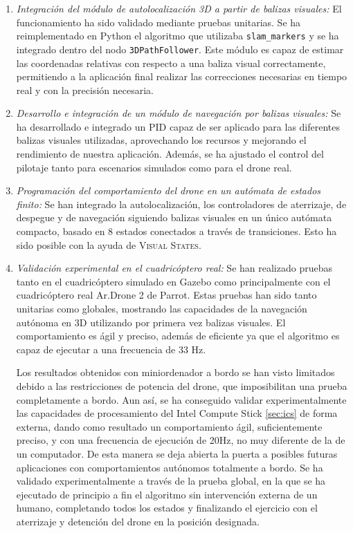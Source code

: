 \begin{enumerate}
	\item \textit{Integración del módulo de autolocalización 3D a partir de balizas visuales:} El funcionamiento ha sido validado mediante pruebas unitarias. Se ha reimplementado en Python el algoritmo que utilizaba \texttt{slam\_markers} y se ha integrado dentro del nodo \texttt{3DPathFollower}. Este módulo es capaz de estimar las coordenadas relativas con respecto a una baliza visual correctamente, permitiendo a la aplicación final realizar las correcciones necesarias en tiempo real y con la precisión necesaria.
	\item \textit{Desarrollo e integración de un módulo de navegación por balizas visuales:} Se ha desarrollado e integrado un PID capaz de ser aplicado para las diferentes balizas visuales utilizadas, aprovechando los recursos y mejorando el rendimiento de nuestra aplicación. Además, se ha ajustado el control del pilotaje tanto para escenarios simulados como para el drone real.
	\item \textit{Programación del comportamiento del drone en un autómata de estados finito:} Se han integrado la autolocalización, los controladores de aterrizaje, de despegue y de navegación siguiendo balizas visuales en un único autómata compacto, basado en 8 estados conectados a través de transiciones. Esto ha sido posible con la ayuda de \textsc{Visual States}.
	\item \textit{Validación experimental en el cuadricóptero  real:} Se han realizado pruebas tanto en el cuadricóptero simulado en Gazebo como principalmente con el cuadricóptero real Ar.Drone 2 de Parrot. Estas pruebas han sido tanto unitarias como globales, mostrando las capacidades de la navegación autónoma en 3D utilizando por primera vez balizas visuales. El comportamiento es ágil y preciso, además de eficiente ya que el algoritmo es capaz de ejecutar a una frecuencia de 33 Hz. 
	
	Los resultados obtenidos con miniordenador a bordo se han visto limitados debido a las restricciones de potencia del drone, que imposibilitan una prueba completamente a bordo. Aun así, se ha conseguido validar experimentalmente las capacidades de procesamiento del Intel Compute Stick \ref{sec:ics} de forma externa, dando como resultado un comportamiento ágil, suficientemente preciso, y con una frecuencia de ejecución de 20Hz, no muy diferente de la de un computador. De esta manera se deja abierta la puerta a posibles futuras aplicaciones con comportamientos autónomos totalmente a bordo. Se ha validado experimentalmente a través de la prueba global, en la que se ha ejecutado de principio a fin el algoritmo sin intervención externa de un humano, completando todos los estados y finalizando el ejercicio con el aterrizaje y detención del drone en la posición designada.
	

\end{enumerate}
